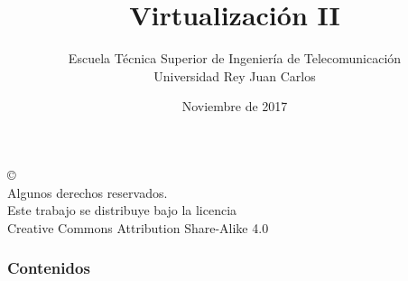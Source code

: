 \documentclass[ucs]{beamer}
\begin{document}
\title[Virtualización II]{Virtualización II}
\author[GSyC]{Escuela Técnica Superior de Ingeniería de Telecomunicación\\
Universidad Rey Juan Carlos}
\date[2017]{Noviembre de 2017}



\begin{frame}
  \titlepage
\end{frame}



\begin{frame}[b]
\begin{flushright}
{\tiny
\copyright \insertshortdate~\insertshortauthor \\
  Algunos derechos reservados. \\
  Este trabajo se distribuye bajo la licencia \\
  Creative Commons Attribution Share-Alike 4.0\\
}
\end{flushright}  
\end{frame}



\begin{frame}
  \frametitle{Contenidos}
  \tableofcontents
\end{frame}






\end{document}
